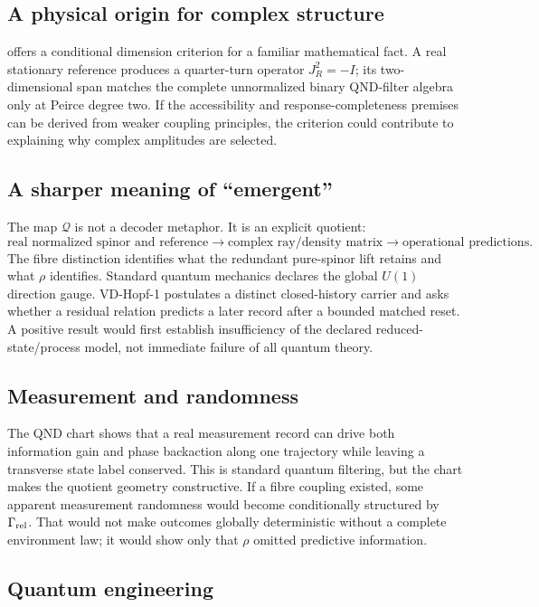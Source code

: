 \documentclass[10pt]{article}
\theoremstyle{definition}
\theoremstyle{remark}
\newcommand{\cQ}{\mathcal Q}
\begin{document}
\subsection{A physical origin for complex structure}

 offers a conditional dimension criterion for a familiar mathematical fact. A real stationary reference produces a quarter-turn operator \(J_R^2=-I\); its two-dimensional span matches the complete unnormalized binary QND-filter algebra only at Peirce degree two. If the accessibility and response-completeness premises can be derived from weaker coupling principles, the criterion could contribute to explaining why complex amplitudes are selected.

\subsection{A sharper meaning of ``emergent''}

The map \(\cQ\) is not a decoder metaphor. It is an explicit quotient:
\[
\text{real normalized spinor and reference}
\longrightarrow
\text{complex ray/density matrix}
\longrightarrow
\text{operational predictions}.
\]
The fibre distinction identifies what the redundant pure-spinor lift retains and what \(\rho\) identifies. Standard quantum mechanics declares the global \(U(1)\) direction gauge. VD-Hopf-1 postulates a distinct closed-history carrier and asks whether a residual relation predicts a later record after a bounded matched reset. A positive result would first establish insufficiency of the declared reduced-state/process model, not immediate failure of all quantum theory.

\subsection{Measurement and randomness}

The QND chart shows that a real measurement record can drive both information gain and phase backaction along one trajectory while leaving a transverse state label conserved. This is standard quantum filtering, but the chart makes the quotient geometry constructive. If a fibre coupling existed, some apparent measurement randomness would become conditionally structured by \(\Gamma_{\rm rel}\). That would not make outcomes globally deterministic without a complete environment law; it would show only that \(\rho\) omitted predictive information.

\subsection{Quantum engineering}
\end{document}
